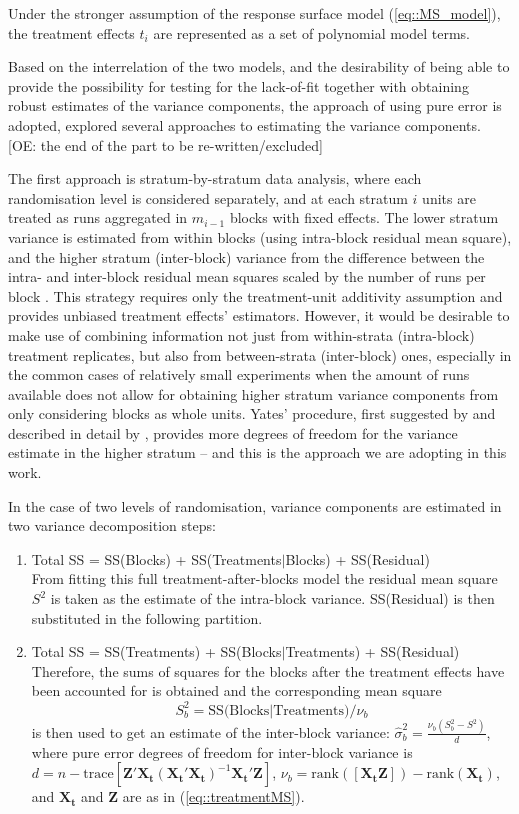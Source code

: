 Under the stronger assumption of the response surface model (\ref{eq::MS_model}), the treatment effects $t_{i}$ are represented as a set of polynomial model terms.  

Based on the interrelation of the two models, and the desirability of being able to provide the possibility for testing for the lack-of-fit together with obtaining robust estimates of the variance components, the approach of using pure error is adopted, \cite{GilmourGoos2016Robust} explored several approaches to estimating the variance components. \\[5 pt]
[OE: the end of the part to be re-written/excluded]

The first approach is stratum-by-stratum data analysis, where each randomisation level is considered separately, and at each stratum $i$ units are treated as runs aggregated in $m_{i-1}$ blocks with fixed effects. The lower stratum variance is estimated from within blocks (using intra-block residual mean square), and the higher stratum (inter-block) variance from the difference between the intra- and inter-block residual mean squares scaled by the number of runs per block \citep{Hinkelmann2005Advanced}. This strategy requires only the treatment-unit additivity assumption and provides unbiased treatment effects' estimators. However, it would be desirable to make use of combining information not just from within-strata (intra-block) treatment replicates, but also from between-strata (inter-block) ones, especially in the common cases of relatively small experiments when the amount of runs available does not allow for obtaining higher stratum variance components from only considering blocks as whole units. Yates' procedure, first suggested by \cite{yates1939recovery} and described in detail by \cite{Hinkelmann2005Advanced}, provides more degrees of freedom for the variance estimate in the higher stratum -- and this is the approach we are adopting in this work. 

In the case of two levels of randomisation, variance components are estimated in two variance decomposition steps: 
\begin{enumerate}
	\item Total SS = SS(Blocks) + SS(Treatments$\vert$Blocks) + SS(Residual)\\
	From fitting this full treatment-after-blocks model the residual mean square $S^2$ is taken as the estimate of the intra-block variance. SS(Residual) is then substituted in the following partition.
	\item Total SS = SS(Treatments) + SS(Blocks$\vert$Treatments) + SS(Residual)\\
	Therefore, the sums of squares for the blocks after the treatment effects have been accounted for is obtained and the corresponding mean square $$S^2_{b}=\mbox{SS(Blocks$\vert$Treatments)}/\nu_{b}$$ is then used to get an estimate of the inter-block variance:
	$\hat{\sigma}^2_{b}=\frac{\nu_{b}(S^2_{b}-S^2)}{d}$,
	where pure error degrees of freedom for inter-block variance is $d=n-\mbox{trace}[\bm{Z}'\bm{X_t}(\bm{X_t}'\bm{X_t})^{-1}\bm{X_t}'\bm{Z}]$, $\nu_{b}=\mbox{rank}([\bm{X_t} \bm{Z}])-\mbox{rank}(\bm{X_t})$, and $\bm{X_t}$ and $\bm{Z}$ are as in (\ref{eq::treatmentMS}).
\end{enumerate}

